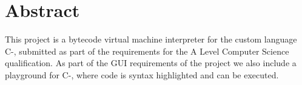 \begingroup
\let\clearpage\relax
\let\cleardoublepage\relax
\let\cleardoublepage\relax

\chapter*{Abstract}
This project is a bytecode virtual machine interpreter for the custom language C-, submitted as part of the requirements for the A Level Computer Science qualification. As part of the GUI requirements of the project we also include a playground for C-, where code is syntax highlighted and can be executed. 
\endgroup			

\vfill